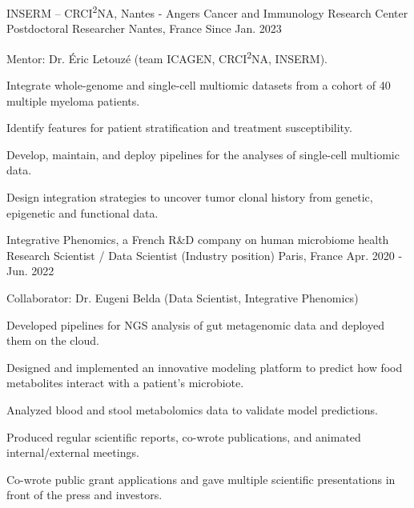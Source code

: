 

\begin{cventries}

  \cventry
    {INSERM -- CRCI\textsuperscript{2}NA, Nantes - Angers Cancer and Immunology Research Center} %
    {Postdoctoral Researcher} %
    {Nantes, France} %
    {Since Jan. 2023} %
    {
	Mentor: Dr. Éric Letouzé (team ICAGEN, CRCI\textsuperscript{2}NA, INSERM).
    \vspace{0.5cm}
	\begin{cvitems} %
		\item {Integrate whole-genome and single-cell multiomic datasets from a cohort of 40 multiple myeloma patients.}
		\item {Identify features for patient stratification and treatment susceptibility.}
		\item {Develop, maintain, and deploy pipelines for the analyses of single-cell multiomic data.}
		\item {Design integration strategies to uncover tumor clonal history from genetic, epigenetic and functional data.}
	\end{cvitems}
    }

  \cventry
    {Integrative Phenomics,  a French R\&D company on human microbiome health} %
    {Research Scientist / Data Scientist (Industry position)} %
    {Paris, France} %
    {Apr. 2020 - Jun. 2022} %
    {
    Collaborator: Dr. Eugeni Belda (Data Scientist, Integrative Phenomics)
    \vspace{0.5cm}
	\begin{cvitems} %
		\item {Developed pipelines for NGS analysis of gut metagenomic data and deployed them on the cloud.}
		\item {Designed and implemented an innovative modeling platform to predict how food metabolites interact with a patient's microbiote.}
		\item {Analyzed blood and stool metabolomics data to validate model predictions.} 
		\item {Produced regular scientific reports, co-wrote publications, and animated internal/external meetings.}
		\item {Co-wrote public grant applications and gave multiple scientific presentations in front of the press and investors.}
	\end{cvitems}
    }


\end{cventries}
